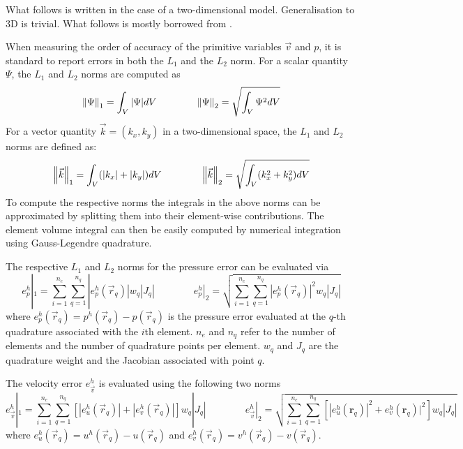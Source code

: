 
What follows is written in the case of a two-dimensional model. Generalisation to
3D is trivial. What follows is mostly borrowed from \cite{thmk14}.

When measuring the order of accuracy of the primitive variables $\vec{v}$ and $p$,
it is standard to report errors in both the $L_1$ and the $L_2$ norm.
For a scalar quantity $\Psi$, the $L_1$ and $L_2$ norms are computed as
\begin{equation}
\left\lVert\Psi\right\rVert_1 = \int_V |\Psi| dV
\quad\quad
\quad\quad
\left\lVert\Psi\right\rVert_2 = \sqrt{ \int_V \Psi^2 dV }
\end{equation}
For a vector quantity $\vec{k}=(k_x,k_y)$ in a two-dimensional space,
the $L_1$ and $L_2$ norms are defined as:
\begin{equation}
\left\lVert\vec{k}\right\rVert_1 = \int_V (|k_x|+|k_y|) dV
\quad\quad
\quad\quad
\left\lVert\vec{k}\right\rVert_2 = \sqrt{ \int_V (k_x^2+k_y^2) dV }
\end{equation}
To compute the respective norms
the integrals in the above norms can be approximated by splitting them
into their element-wise contributions. The element volume integral can then
be easily computed by numerical integration using Gauss-Legendre quadrature.

The respective $L_1$ and $L_2$ norms for the pressure error can be evaluated via
\begin{equation}
e_p^h|_1 = \sum_{i=1}^{n_e} \sum_{q=1}^{n_q} |e_p^h(\vec{r}_q)| w_q |J_q|
\quad\quad
\quad\quad
e_p^h|_2=\sqrt{ \sum_{i=1}^{n_e} \sum_{q=1}^{n_q} |e_p^h(\vec{r}_q)|^2 w_q |J_q| }
\end{equation}
where $e_p^h(\vec{r}_q)=p^h(\vec{r}_q) - p(\vec{r}_q)$ 
is the pressure error evaluated at the $q$-th quadrature associated with
the $i$th element. $n_e$ and $n_q$ refer to the number of elements and
the number of quadrature points per element.
$w_q$ and $J_q$ are the quadrature weight and the Jacobian associated with
point $q$.

The velocity error $e_{\vec v}^h$ is evaluated using the following two norms
\begin{equation}
e_{\vec{v}}^h|_1 = \sum_{i=1}^{n_e} \sum_{q=1}^{n_q} [ |e_u^h(\vec{r}_q)| + |e_v^h(\vec{r}_q)| ]    w_q |J_q|
\quad\quad
\quad\quad
e_{\vec v}^h|_2=\sqrt{ \sum_{i=1}^{n_e} \sum_{q=1}^{n_q} \left[ |e_u^h({\bm r}_q)|^2 +  e_v^h({\bm r}_q)|^2 \right] w_q |J_q| }
\end{equation}
where $e_u^h(\vec{r}_q)=u^h(\vec{r}_q) - u(\vec{r}_q)$ and $e_v^h(\vec{r}_q)=v^h(\vec{r}_q)-v(\vec{r}_q)$.


